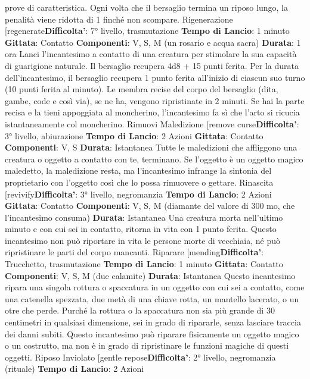 \begin{multicols}{2}
prove di caratteristica. Ogni volta che il bersaglio
termina un riposo lungo, la penalità viene ridotta di 1
finché non scompare.
Rigenerazione
[regenerate\textbf{Difficolta'}:
7° livello, trasmutazione
\textbf{Tempo di Lancio}: 1 minuto
\textbf{Gittata}: Contatto
\textbf{Componenti}: V, S, M (un rosario e acqua sacra)
\textbf{Durata}: 1 ora
Lanci l’incantesimo a contatto di una creatura per
stimolare la sua capacità di guarigione naturale. Il
bersaglio recupera 4d8 + 15 punti ferita. Per la durata
dell’incantesimo, il bersaglio recupera 1 punto ferita
all’inizio di ciascun suo turno (10 punti ferita al minuto).
Le membra recise del corpo del bersaglio (dita, gambe,
code e così via), se ne ha, vengono ripristinate in 2
minuti. Se hai la parte recisa e la tieni appoggiata al
moncherino, l’incantesimo fa sì che l’arto si ricucia
istantaneamente col moncherino.
Rimuovi Maledizione
[remove curse\textbf{Difficolta'}:
3° livello, abiurazione
\textbf{Tempo di Lancio}: 2 Azioni
\textbf{Gittata}: Contatto
\textbf{Componenti}: V, S
\textbf{Durata}: Istantanea
Tutte le maledizioni che affliggono una creatura o
oggetto a contatto con te, terminano. Se l’oggetto è un
oggetto magico maledetto, la maledizione resta, ma
l’incantesimo infrange la sintonia del proprietario con
l’oggetto così che lo possa rimuovere o gettare.
Rinascita
[revivify\textbf{Difficolta'}:
3° livello, negromanzia
\textbf{Tempo di Lancio}: 2 Azioni
\textbf{Gittata}: Contatto
\textbf{Componenti}: V, S, M (diamante del valore di 300 mo,
che l’incantesimo consuma)
\textbf{Durata}: Istantanea
Una creatura morta nell’ultimo minuto e con cui sei in
contatto, ritorna in vita con 1 punto ferita. Questo
incantesimo non può riportare in vita le persone morte
di vecchiaia, né può ripristinare le parti del corpo
mancanti.
Riparare
[mending\textbf{Difficolta'}:
Trucchetto, trasmutazione
\textbf{Tempo di Lancio}: 1 minuto
\textbf{Gittata}: Contatto
\textbf{Componenti}: V, S, M (due calamite)
\textbf{Durata}: Istantanea
Questo incantesimo ripara una singola rottura o
spaccatura in un oggetto con cui sei a contatto, come
una catenella spezzata, due metà di una chiave rotta,
un mantello lacerato, o un otre che perde. Purché la
rottura o la spaccatura non sia più grande di 30
centimetri in qualsiasi dimensione, sei in grado di
ripararle, senza lasciare traccia dei danni subiti.
Questo incantesimo può riparare fisicamente un
oggetto magico o un costrutto, ma non è in grado di
ripristinare le funzioni magiche di questi oggetti.
Riposo Inviolato
[gentle repose\textbf{Difficolta'}:
2° livello, negromanzia (rituale)
\textbf{Tempo di Lancio}: 2 Azioni

\end{multicols}
